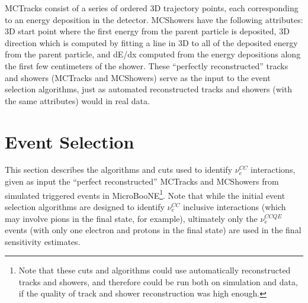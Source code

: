 
{\sc MCTracks} consist of a series of ordered 3D trajectory points, each corresponding to an energy deposition in the detector. {\sc MCShowers} have the following attributes: 3D start point where the first energy from the parent particle is deposited, 3D direction which is computed by fitting a line in 3D to all of the deposited energy from the parent particle, and dE/dx computed from the energy depositions along the first few centimeters of the shower. These ``perfectly reconstructed'' tracks and showers ({\sc MCTracks} and {\sc MCShowers}) serve as the input to the event selection algorithms, just as automated reconstructed tracks and showers (with the same attributes) would in real data.\\




\section{Event Selection}\label{LEE_eventselection_section}
This section describes the algorithms and cuts used to identify $\nu_e^{CC}$ interactions, given as input the ``perfect reconstructed'' {\sc MCTracks} and {\sc MCShowers} from simulated triggered events in MicroBooNE\footnote{Note that these cuts and algorithms could use automatically reconstructed tracks and showers, and therefore could be run both on simulation and data, if the quality of track and shower reconstruction was high enough.}. Note that while the initial event selection algorithms are designed to identify $\nu_e^{CC}$ inclusive interactions (which may involve pions in the final state, for example), ultimately only the $\nu_e^{CCQE}$ events (with only one electron and protons in the final state) are used in the final sensitivity estimates.\\

